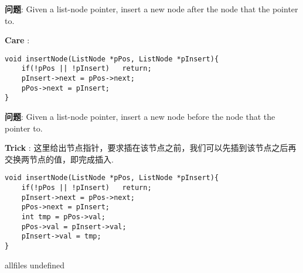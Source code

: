 \documentclass{article}
\begin{document}
\begin{CJK}{UTF8}{gbsn}     %

\else

\begin{description}
    \item{\textbf{问题}}: Given a list-node pointer, insert a new node after the node that the pointer to.
    \item{\textbf{Care}} : 
    \begin{lstlisting}
void insertNode(ListNode *pPos, ListNode *pInsert){
	if(!pPos || !pInsert)	return;
	pInsert->next = pPos->next;
	pPos->next = pInsert;
}
    \end{lstlisting}
\end{description}
    
\begin{description}
    \item{\textbf{问题}}: Given a list-node pointer, insert a new node before the node that the pointer to.
    \item{\textbf{Trick}} : 
	这里给出节点指针，要求插在该节点之前，我们可以先插到该节点之后再交换两节点的值，即完成插入.
    \begin{lstlisting}
void insertNode(ListNode *pPos, ListNode *pInsert){
	if(!pPos || !pInsert)	return;
	pInsert->next = pPos->next;
	pPos->next = pInsert;
	int tmp = pPos->val;
	pPos->val = pInsert->val;
	pInsert->val = tmp;
}
    \end{lstlisting}
\end{description}

\fi

\ifx allfiles undefined
\end{CJK}
\end{document}
